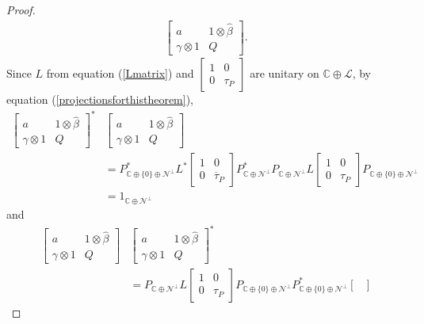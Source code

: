 \documentclass[11pt, reqno]{amsart}
\newcommand\1{\boldsymbol {1}}
\numberwithin{equation}{section}
\begin{document}
\begin{proof}
\begin{align*}
\begin{bmatrix}
    a & 1\otimes {\hat{\beta}} \\
    \gamma\otimes 1 & Q
\end{bmatrix}.
\end{align*}
Since $L$ from equation (\ref{Lmatrix}) and 
$\begin{bmatrix}
    1 & 0 \\
    0 & \tau_{P}
\end{bmatrix}$
are unitary on $\mathbb{C}\oplus\mathcal{L}$, by equation (\ref{projectionsforthistheorem}), 
\begin{align*}
    \begin{bmatrix}
    a & 1\otimes {\hat{\beta}} \\
    \gamma\otimes 1 & Q
\end{bmatrix}^{*}&\begin{bmatrix}
    a & 1\otimes{\hat{\beta}} \\
    \gamma\otimes 1 & Q
\end{bmatrix}\\
&=P^{*}_{\mathbb{C}\oplus\{0\}\oplus\mathcal{N}^{\perp}}L^{*}\begin{bmatrix}
    1 & 0 \\
    0& \overline{\tau}_{P}
\end{bmatrix}P^{*}_{\mathbb{C}\oplus\mathcal{N}^{\perp}}P_{\mathbb{C}\oplus\mathcal{N}^{\perp}}L\begin{bmatrix}
    1 & 0 \\
    0& \tau_{P}
\end{bmatrix}P_{\mathbb{C}\oplus\{0\}\oplus\mathcal{N}^{\perp}} \\
&= 1_{\mathbb{C}\oplus\mathcal{N}^{\perp}}
\end{align*}
and
\begin{align*}
    \begin{bmatrix}
    a & 1\otimes {\hat{\beta}} \\
    \gamma\otimes 1 & Q
\end{bmatrix}&\begin{bmatrix}
    a & 1\otimes {\hat{\beta}} \\
    \gamma\otimes 1 & Q
\end{bmatrix}^{*}\\
&=P_{\mathbb{C}\oplus\mathcal{N}^{\perp}}L\begin{bmatrix}
    1 & 0 \\
    0& \tau_{P}
\end{bmatrix}P_{\mathbb{C}\oplus\{0\}\oplus\mathcal{N}^{\perp}}P^{*}_{\mathbb{C}\oplus\{0\}\oplus\mathcal{N}^{\perp}}\begin{bmatrix}

\end{bmatrix}
\end{align*}
\end{proof}
\end{document}
